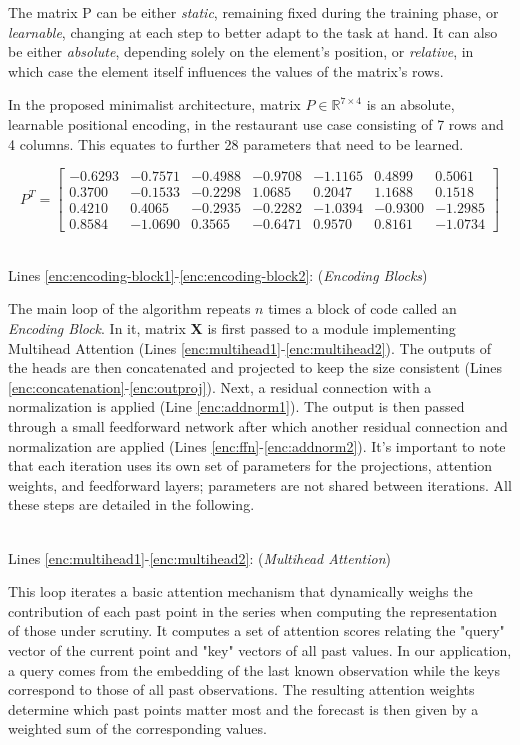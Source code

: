 \documentclass[algorithms,article,submit,pdftex,moreauthors]{Definitions/mdpi}
\begin{document}
The matrix P can be either \textit{static}, remaining fixed during the training phase, or \textit{learnable}, changing at each step to better adapt to the task at hand. It can also be either \textit{absolute}, depending solely on the element's position, or \textit{relative}, in which case the element itself influences the values of the matrix's rows. 

In the proposed minimalist architecture, matrix $P \in \mathbb{R}^{7 \times 4}$ is an absolute, learnable positional encoding, in the restaurant use case consisting of 7 rows and 4 columns. This equates to further 28 parameters that need to be learned.

$$
P^T = 
\begin{bmatrix}
 -0.6293 & -0.7571 & -0.4988 & -0.9708 & -1.1165 &  0.4899 &  0.5061 \\
  0.3700 & -0.1533 & -0.2298 &  1.0685 &  0.2047 &  1.1688 &  0.1518 \\
  0.4210 &  0.4065 & -0.2935 & -0.2282 & -1.0394 & -0.9300 & -1.2985 \\
  0.8584 & -1.0690 &  0.3565 & -0.6471 &  0.9570 &  0.8161 & -1.0734
\end{bmatrix}
$$

~\\Lines \ref{enc:encoding-block1}-\ref{enc:encoding-block2}: (\textit{Encoding Blocks})

The main loop of the algorithm repeats $n$ times a block of code called an {\it Encoding Block}. In it, matrix {\bf X} is first passed to a module implementing Multihead Attention (Lines \ref{enc:multihead1}-\ref{enc:multihead2}). The outputs of the heads are then concatenated and projected to keep the size consistent (Lines \ref{enc:concatenation}-\ref{enc:outproj}). Next, a residual connection with a normalization is applied (Line \ref{enc:addnorm1}). The output is then passed through a small feedforward network after which another residual connection and normalization are applied (Lines \ref{enc:ffn}-\ref{enc:addnorm2}).
It's important to note that each iteration uses its own set of parameters for the projections, attention weights, and feedforward layers; parameters are not shared between iterations.
All these steps are detailed in the following.

~\\Lines \ref{enc:multihead1}-\ref{enc:multihead2}: (\textit{Multihead Attention})

This loop iterates a basic attention mechanism that dynamically weighs the contribution of each past point in the series when computing the representation of those under scrutiny. It computes a set of attention scores relating the "query" vector of the current point and "key" vectors of all past values. In our application, a query comes from the embedding of the last known observation while the keys correspond to those of all past observations. The resulting attention weights determine which past points matter most and the forecast is then given by a weighted sum of the corresponding values.
\end{document}
